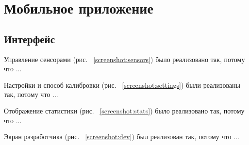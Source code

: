 \documentclass[14pt]{matmex-diploma-custom}
\begin{document}
\section{Мобильное приложение}
\subsection{Интерфейс}
Управление сенсорами (рис. ~\ref{screenshot:sensors}) было реализовано так,
потому что ...

Настройки и способ калибровки (рис. ~\ref{screenshot:settings}) были реализованы
так, потому что ...

Отображение статистики (рис. ~\ref{screenshot:stats}) было реализовано так,
потому что ...

Экран разработчика (рис. ~\ref{screenshot:dev}) был реализован так, потому что
...
\end{document}
